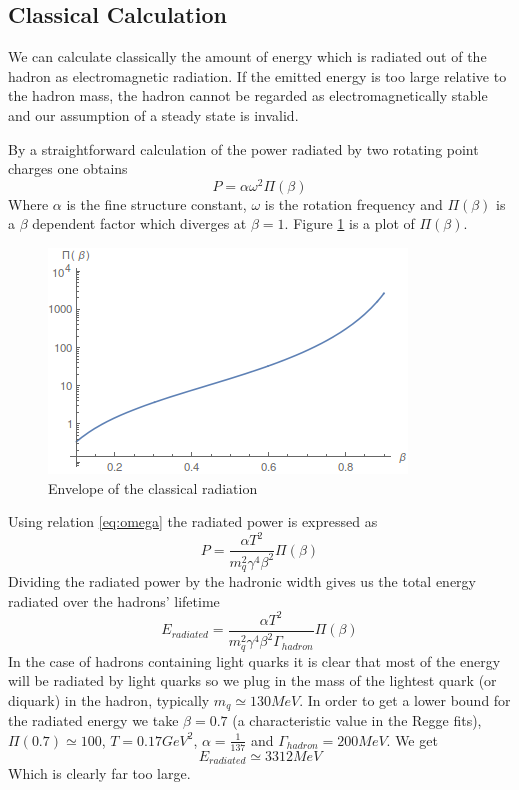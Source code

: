 \documentclass[11pt,a4paper]{article}
\begin{document}
\subsection{Classical Calculation}

We can calculate classically the amount of energy which is radiated out of the hadron as electromagnetic radiation. If the emitted energy is too large relative to the hadron mass, the hadron cannot be regarded as electromagnetically stable and our assumption of a steady state is invalid.

By a straightforward calculation of the power radiated by two rotating point charges one obtains
\begin{equation}
P=\alpha \omega^2 \Pi\left(\beta\right)
\end{equation}
Where $\alpha$ is the fine structure constant, $\omega$ is the rotation frequency and $\Pi\left(\beta\right)$ is a $\beta$ dependent factor which diverges at $\beta=1$. Figure \ref{fig:radiation} is a plot of $\Pi\left(\beta\right)$.
\begin{figure}[h]
\centering
\includegraphics[scale=0.7]{figures/radiation.png}
\caption{Envelope of the classical radiation}
\label{fig:radiation}
\end{figure}
Using relation \ref{eq:omega} the radiated power is expressed as
\begin{equation}
P=\frac{\alpha T^2}{m_q^2 \gamma^4\beta^2} \Pi\left(\beta\right)
\end{equation}
Dividing the radiated power by the hadronic width gives us the total energy radiated over the hadrons' lifetime
\begin{equation}
E_{radiated}=\frac{\alpha T^2}{m_q^2 \gamma^4\beta^2 \Gamma_{hadron}} \Pi\left(\beta\right)
\end{equation}
In the case of hadrons containing light quarks it is clear that most of the energy will be radiated by light quarks so we plug in the mass of the lightest quark (or diquark) in the hadron, typically $m_q\simeq 130 MeV$. In order to get a lower bound for the radiated energy we take $\beta=0.7$ (a characteristic value in the Regge fits),$\Pi(0.7)\simeq 100$, $T=0.17 GeV^2$, $\alpha=\frac{1}{137}$ and $\Gamma_{hadron}=200 MeV$. We get
\begin{equation}
E_{radiated}\simeq 3312 MeV
\end{equation}
Which is clearly far too large.
\end{document}
